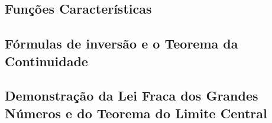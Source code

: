 \documentclass[../Notas.tex]{subfiles}
\begin{document}
\subsection{Funções Características}

\subsection{Fórmulas de inversão e o Teorema da Continuidade}

\subsection{Demonstração da Lei Fraca dos Grandes Números e do Teorema do Limite Central}
\end{document}

